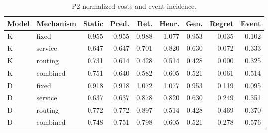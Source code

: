 \begin{table}[htbp]\caption{P2 normalized costs and event incidence.}\centering\small\setlength{\tabcolsep}{3pt}

\begin{tabular}{llrrrrrrr}\toprule

Model & Mechanism & Static & Pred. & Ret. & Heur. & Gen. & Regret & Event\\\midrule

K & fixed & 0.955 & 0.955 & 0.988 & 1.077 & 0.953 & 0.035 & 0.102\\

K & service & 0.647 & 0.647 & 0.701 & 0.820 & 0.630 & 0.072 & 0.333\\

K & routing & 0.731 & 0.614 & 0.428 & 0.514 & 0.428 & 0.000 & 0.325\\

K & combined & 0.751 & 0.640 & 0.582 & 0.605 & 0.521 & 0.061 & 0.514\\

D & fixed & 0.918 & 0.918 & 1.072 & 1.077 & 0.953 & 0.119 & 0.095\\

D & service & 0.637 & 0.637 & 0.878 & 0.820 & 0.630 & 0.249 & 0.351\\

D & routing & 0.772 & 0.772 & 0.897 & 0.514 & 0.428 & 0.469 & 0.370\\

D & combined & 0.748 & 0.751 & 0.798 & 0.605 & 0.521 & 0.278 & 0.576\\

\bottomrule\end{tabular}\end{table}

